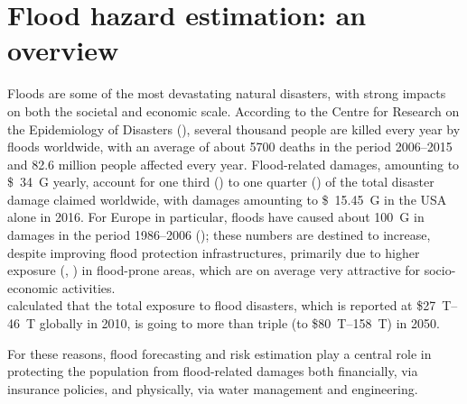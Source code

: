 \section{Flood hazard estimation: an overview}
Floods are some of the most devastating natural disasters, with strong impacts on both the societal and economic scale. According to the Centre for Research on the Epidemiology of Disasters (\cite{Guha-sapir2011}), several thousand people are killed every year by floods worldwide, with an average of about 5700 deaths in the period 2006--2015 and 82.6 million people affected every year. Flood-related damages, amounting to \SI{34}[\$]{G} yearly, account for one third (\cite{MunichRE}) to one quarter (\cite{Guha-sapir2011}) of the total disaster damage claimed worldwide, with damages amounting to \SI{15.45}[\$]{G} in the USA alone in 2016. For Europe in particular, floods have caused about \SI{100}[\€]{G} in damages in the period 1986--2006 (\cite{Cea2007}); these numbers are destined to increase, despite improving flood protection infrastructures, primarily due to higher exposure (\cite{MunichRE2015}, \cite{Kron2005}) in flood-prone areas, which are on average very attractive for socio-economic activities.\\
\cite{Jongman2012} calculated that the total exposure to flood disasters, which is reported at \$\SIrange{27}{46}{T} globally in 2010, is going to more than triple (to \$\SIrange{80}{158}{T}) in 2050.

For these reasons, flood forecasting and risk estimation play a central role in protecting the population from flood-related damages both financially, via insurance policies, and physically, via water management and engineering.

